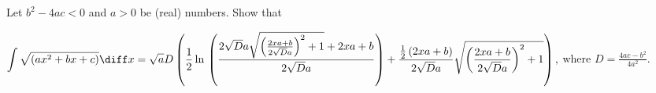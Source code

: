 \label{problemIntegrate sqrt(ax^2+bx+c)dx}
Let $b^2-4ac<0$ and $a>0$ be (real) numbers. Show that 

$\displaystyle
\int \sqrt{\left(ax^2+bx+c\right)}\diff x = \sqrt{a} D \left(\frac{1}{2} \ln{}\left( \frac{2\sqrt{D} a \sqrt{\left(\frac{2 x a+b}{2 \sqrt{D} a}\right)^{2}+1} +2 x a+b}{2 \sqrt{D} a}\right)+\frac{\frac{1}{2} \left(2 x a+b\right)}{2 \sqrt{D} a} \sqrt{\left(\frac{2 x a+b}{2 \sqrt{D} a}\right)^{2}+1}\right),
$
where 
$\displaystyle D=\frac{4ac-b^2}{4a^2}$.




